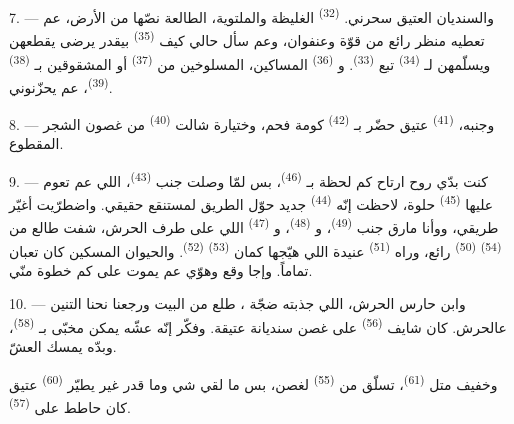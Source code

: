 \VUsaut{3.0mm}
\VUsaut{3.0mm}

7. --- والسنديان العتيق سحرني.  \textsuperscript{(32)}
الغليظة والملتوية، الطالعة نصّها من الأرض، عم تعطيه منظر رائع من قوّة
وعنفوان، وعم سأل حالي كيف  \textsuperscript{(35)}
بيقدر يرضى يقطعهن ويسلّمهن لـ \textsuperscript{(34)} تبع
 \textsuperscript{(33)}. و
\textsuperscript{(36)} المساكين، المسلوخين من 
\textsuperscript{(37)} أو المشقوقين بـ \textsuperscript{(38)}
 \textsuperscript{(39)}، عم يحزّنوني.

8. --- وجنبه،  \textsuperscript{(41)} عتيق حضّر
بـ \textsuperscript{(42)} كومة فحم، وختيارة شالت
 \textsuperscript{(40)}  من غصون الشجر
المقطوع.

\VUsaut{3.0mm}
\VUsaut{3.0mm}

9. --- كنت بدّي روح ارتاح كم لحظة بـ
\textsuperscript{(46)}، بس لمّا وصلت جنب 
\textsuperscript{(43)}، اللي عم تعوم عليها 
\textsuperscript{(45)} حلوة، لاحظت إنّه 
\textsuperscript{(44)} جديد حوّل الطريق لمستنقع حقيقي. واضطرّيت أغيّر
طريقي، ووأنا مارق جنب  \textsuperscript{(49)}،
و \textsuperscript{(48)}، و
\textsuperscript{(47)} اللي على طرف الحرش، شفت طالع من 
\textsuperscript{(54)}  \textsuperscript{(50)} رائع، وراه
 \textsuperscript{(51)} عنيدة اللي هيّجها كمان
 \textsuperscript{(53)} 
\textsuperscript{(52)}. والحيوان المسكين كان تعبان تماماً. وإجا وقع وهوّي
عم يموت على كم خطوة منّي.

10. --- وابن حارس الحرش، اللي جذبته ضجّة ، طلع من
البيت ورجعنا نحنا التنين عالحرش. كان شايف 
\textsuperscript{(56)} على غصن سنديانة عتيقة. وفكّر إنّه عشّه يمكن مخبّى
بـ \textsuperscript{(58)}، وبدّه يمسك العشّ.

وخفيف متل  \textsuperscript{(61)}، تسلّق من 
\textsuperscript{(55)} لغصن، بس ما لقي شي وما قدر غير يطيّر
 \textsuperscript{(60)} عتيق كان حاطط على 
\textsuperscript{(57)}.

\VUsaut{4.0mm}
\VUfilet{22mm}
